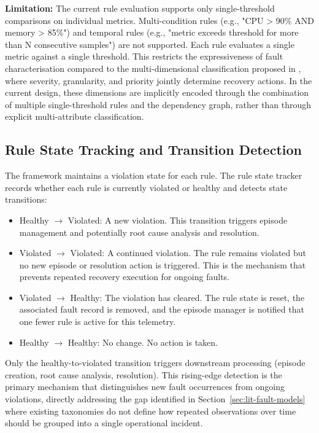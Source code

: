 \textbf{Limitation:} The current rule evaluation supports only single-threshold comparisons on individual metrics. Multi-condition rules (e.g., "CPU > 90\% AND memory > 85\%") and temporal rules (e.g., "metric exceeds threshold for more than N consecutive samples") are not supported. Each rule evaluates a single metric against a single threshold. This restricts the expressiveness of fault characterisation compared to the multi-dimensional classification proposed in \cite{ref1}, where severity, granularity, and priority jointly determine recovery actions. In the current design, these dimensions are implicitly encoded through the combination of multiple single-threshold rules and the dependency graph, rather than through explicit multi-attribute classification.

\subsection{Rule State Tracking and Transition Detection}\label{sec:rule-state-tracking}

The framework maintains a violation state for each rule. The rule state tracker records whether each rule is currently violated or healthy and detects state transitions:

\begin{itemize}
\item Healthy $\rightarrow$ Violated: A new violation. This transition triggers episode management and potentially root cause analysis and resolution.
\item Violated $\rightarrow$ Violated: A continued violation. The rule remains violated but no new episode or resolution action is triggered. This is the mechanism that prevents repeated recovery execution for ongoing faults.
\item Violated $\rightarrow$ Healthy: The violation has cleared. The rule state is reset, the associated fault record is removed, and the episode manager is notified that one fewer rule is active for this telemetry.
\item Healthy $\rightarrow$ Healthy: No change. No action is taken.
\end{itemize}

Only the healthy-to-violated transition triggers downstream processing (episode creation, root cause analysis, resolution). This rising-edge detection is the primary mechanism that distinguishes new fault occurrences from ongoing violations, directly addressing the gap identified in Section~\ref{sec:lit-fault-models} where existing taxonomies \cite{ref1,ref3,ref5} do not define how repeated observations over time should be grouped into a single operational incident.

